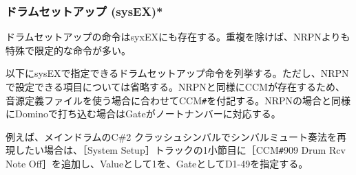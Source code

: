 \documentclass[uplatex, 10pt, dvipdfmx]{jsarticle}
\numberwithin{equation}{section}
\newcommand{\emphj}[1]{\textbf{\textrm{\textgt{{#1}}}}}
\begin{document}
\begin{description}



\end{description}

\subsubsection{ドラムセットアップ (sysEX)*}
ドラムセットアップの命令はsyxEXにも存在する。重複を除けば、NRPNよりも特殊で限定的な命令が多い。

以下にsysEXで指定できるドラムセットアップ命令を列挙する。ただし、NRPNで設定できる項目については省略する。NRPNと同様にCCMが存在するため、音源定義ファイルを使う場合に合わせてCCM\texttt{\#}を付記する。NRPNの場合と同様にDominoで打ち込む場合はGateがノートナンバーに対応する。

例えば、メインドラムのC\#2 クラッシュシンバルでシンバルミュート奏法を再現したい場合は、［System Setup］トラックの1小節目に［CCM\texttt{\#}909 Drum Rcv Note Off］を追加し、Valueとして1を、GateとしてD1-49を指定する。
\end{document}
